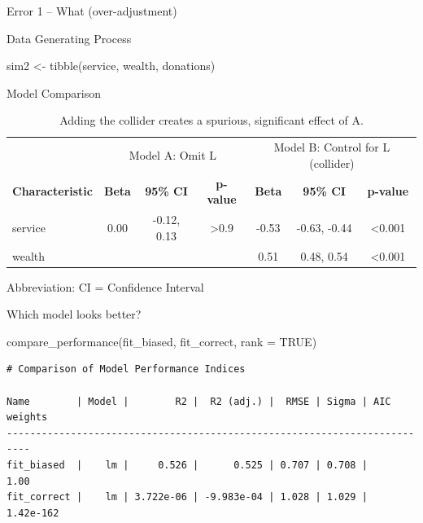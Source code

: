 \documentclass[
  ignorenonframetext,
  aspectratio=169,
]{beamer}
\newenvironment{Shaded}{\begin{snugshade}}{\end{snugshade}}
\newcommand{\AttributeTok}[1]{\textcolor[rgb]{0.40,0.45,0.13}{#1}}
\newcommand{\ConstantTok}[1]{\textcolor[rgb]{0.56,0.35,0.01}{#1}}
\newcommand{\FunctionTok}[1]{\textcolor[rgb]{0.28,0.35,0.67}{#1}}
\newcommand{\NormalTok}[1]{\textcolor[rgb]{0.00,0.23,0.31}{#1}}
\newcommand{\OtherTok}[1]{\textcolor[rgb]{0.00,0.23,0.31}{#1}}
\begin{document}
\begin{frame}[fragile]{Error 1 -- What (over-adjustment)}
\begin{block}{Data Generating Process}
\begin{Shaded}
\begin{Highlighting}[]
\NormalTok{sim2 }\OtherTok{\textless{}{-}} \FunctionTok{tibble}\NormalTok{(service, wealth, donations)}
\end{Highlighting}
\end{Shaded}
\end{block}

\begin{block}{Model Comparison}
\label{model-comparison-1}
\begin{table}
\caption{Adding the collider creates a spurious, significant effect of A.}\tabularnewline

\fontsize{12.0pt}{14.4pt}\selectfont
\begin{tabular*}{\linewidth}{@{\extracolsep{\fill}}lcccccc}
\toprule
 & \multicolumn{3}{c}{Model A: Omit L} & \multicolumn{3}{c}{Model B: Control for L (collider)} \\ 
\cmidrule(lr){2-4} \cmidrule(lr){5-7}
\textbf{Characteristic} & \textbf{Beta} & \textbf{95\% CI} & \textbf{p-value} & \textbf{Beta} & \textbf{95\% CI} & \textbf{p-value} \\ 
\midrule\addlinespace[2.5pt]
service & 0.00 & -0.12, 0.13 & >0.9 & -0.53 & -0.63, -0.44 & <0.001 \\ 
wealth &  &  &  & 0.51 & 0.48, 0.54 & <0.001 \\ 
\bottomrule
\end{tabular*}
\begin{minipage}{\linewidth}
Abbreviation: CI = Confidence Interval\\
\end{minipage}
\end{table}
\end{block}

\begin{block}{Which model looks better?}
\label{which-model-looks-better-1}
\begin{Shaded}
\begin{Highlighting}[]
\FunctionTok{compare\_performance}\NormalTok{(fit\_biased, fit\_correct, }\AttributeTok{rank =} \ConstantTok{TRUE}\NormalTok{)}
\end{Highlighting}
\end{Shaded}

\begin{verbatim}
# Comparison of Model Performance Indices

Name        | Model |        R2 |  R2 (adj.) |  RMSE | Sigma | AIC weights
--------------------------------------------------------------------------
fit_biased  |    lm |     0.526 |      0.525 | 0.707 | 0.708 |        1.00
fit_correct |    lm | 3.722e-06 | -9.983e-04 | 1.028 | 1.029 |   1.42e-162


\end{verbatim}
\end{block}
\end{frame}
\end{document}
